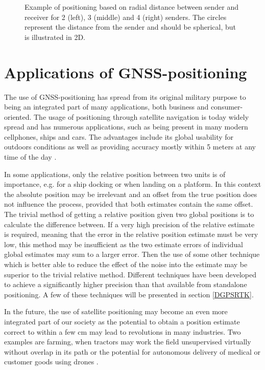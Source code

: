 \begin{figure}[h!]
\begin{minipage}[t]{0.3\textwidth}
\end{minipage}
\caption{\label{fig:Trilateration} Example of positioning based on radial distance between sender and receiver for 2 (left), 3 (middle) and 4 (right) senders. The circles represent the distance from the sender and should be spherical, but is illustrated in 2D.}
\end{figure}

\section{Applications of GNSS-positioning}
The use of GNSS-positioning has spread from its original military purpose to being an integrated part of many applications, both business and consumer-oriented. The usage of positioning through satellite navigation is today widely spread and has numerous applications, such as being present in many modern cellphones, ships and cars. The advantages include its global usability for outdoors conditions as well as providing accuracy mostly within 5 meters at any time of the day \cite{posAccuracy}.
\par
In some applications, only the relative position between two units is of importance, e.g. for a ship docking or when landing on a platform. In this context the absolute position may be irrelevant and an offset from the true position does not influence the process, provided that both estimates contain the same offset. The trivial method of getting a relative position given two global positions is to calculate the difference between. If a very high precision of the relative estimate is required, meaning that the error in the relative position estimate must be very low, this method may be insufficient as the two estimate errors of individual global estimates may sum to a larger error. Then the use of some other technique which is better able to reduce the effect of the noise into the estimate may be superior to the trivial relative method. Different techniques have been developed to achieve a significantly higher precision than that available from standalone positioning. A few of these techniques  will be presented in section \ref{DGPSRTK}. 
\par
In the future, the use of satellite positioning may become an even more integrated part of our society as the potential to obtain a position estimate correct to within a few cm may lead to revolutions in many industries. Two examples are farming, when tractors may work the field unsupervised virtually without overlap in its path \cite{garcianoglobal} or the potential for autonomous delivery of medical or customer goods using drones \cite{Patrik2019}. 


